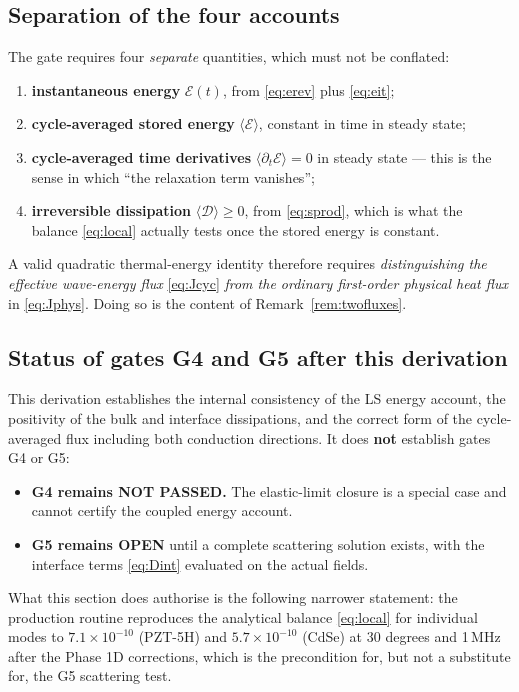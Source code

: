 \documentclass[11pt]{article}
\theoremstyle{plain}
\begin{document}
\subsection{Separation of the four accounts}

The gate requires four \emph{separate} quantities, which must not be conflated:
\begin{enumerate}
\item \textbf{instantaneous energy} $\mathcal E(t)$, from \eqref{eq:erev} plus
      \eqref{eq:eit};
\item \textbf{cycle-averaged stored energy}
      $\langle\mathcal E\rangle$, constant in time in steady state;
\item \textbf{cycle-averaged time derivatives}
      $\langle\partial_t\mathcal E\rangle=0$ in steady state --- this is the
      sense in which ``the relaxation term vanishes'';
\item \textbf{irreversible dissipation} $\langle\mathcal D\rangle\ge0$, from
      \eqref{eq:sprod}, which is what the balance \eqref{eq:local} actually
      tests once the stored energy is constant.
\end{enumerate}
A valid quadratic thermal-energy identity therefore requires
\emph{distinguishing the effective wave-energy flux} \eqref{eq:Jcyc}
\emph{from the ordinary first-order physical heat flux} in \eqref{eq:Jphys}.
Doing so is the content of Remark~\ref{rem:twofluxes}.

\subsection{Status of gates G4 and G5 after this derivation}

This derivation establishes the internal consistency of the LS energy account,
the positivity of the bulk and interface dissipations, and the correct form of
the cycle-averaged flux including both conduction directions. It does
\textbf{not} establish gates G4 or G5:
\begin{itemize}
\item \textbf{G4 remains NOT PASSED.} The elastic-limit closure is a special
case and cannot certify the coupled energy account.
\item \textbf{G5 remains OPEN} until a complete scattering solution exists, with
      the interface terms \eqref{eq:Dint} evaluated on the actual fields.
\end{itemize}
What this section does authorise is the following narrower statement: the
production routine reproduces the analytical balance \eqref{eq:local} for
individual modes to $7.1\times10^{-10}$ (PZT-5H) and $5.7\times10^{-10}$ (CdSe)
at 30 degrees and 1\,MHz after the Phase 1D corrections, which is the
precondition for, but not a substitute for, the G5 scattering test.
\end{document}
